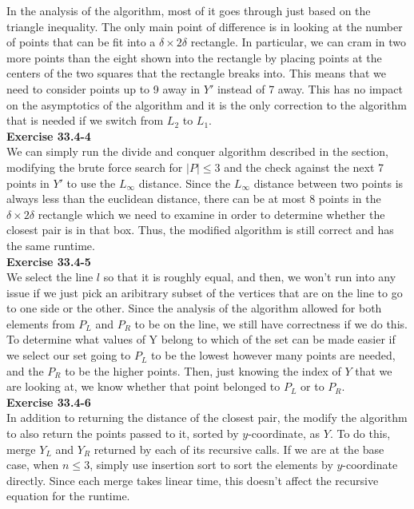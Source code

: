 \documentclass{article}
\begin{document}
In the analysis of the algorithm, most of it goes through just based on the triangle inequality. The only main point of difference is in looking at the number of points that can be fit into a $\delta \times 2\delta$ rectangle. In particular, we can cram in two more points than the eight shown into the rectangle by placing points at the centers of the two squares that the rectangle breaks into. This means that we need to consider points up to 9 away in $Y'$ instead of 7 away. This has no impact on the asymptotics of the algorithm and it is the only correction to the algorithm that is needed if we switch from $L_2$ to $L_1$.\\

\noindent\textbf{Exercise 33.4-4}\\

We can simply run the divide and conquer algorithm described in the section, modifying the brute force search for $|P| \leq 3$ and the check against the next 7 points in $Y'$ to use the $L_\infty$ distance.  Since the $L_\infty$ distance between two points is always less than the euclidean distance, there can be at most 8 points in the $\delta \times 2\delta$ rectangle which we need to examine in order to determine whether the closest pair is in that box.  Thus, the modified algorithm is still correct and has the same runtime. \\

\noindent\textbf{Exercise 33.4-5}\\

We select the line $l$ so that it is roughly equal, and then, we won't run into any issue if we just pick an aribitrary subset of the vertices that are on the line to go to one side or the other. Since the analysis of the algorithm allowed for both elements from $P_L$ and $P_R$ to be on the line, we still have correctness if we do this. To determine what values of Y belong to which of the set can be made easier if we select our set going to $P_L$ to be the lowest however many points are needed, and the $P_R$ to be the higher points. Then, just knowing the index of $Y$ that we are looking at, we know whether that point belonged to $P_L$ or to $P_R$.\\

\noindent\textbf{Exercise 33.4-6}\\

In addition to returning the distance of the closest pair, the modify the algorithm to also return the points passed to it, sorted by $y$-coordinate, as $Y$.  To do this, merge $Y_L$ and $Y_R$ returned by each of its recursive calls.  If we are at the base case, when $n \leq 3$, simply use insertion sort to sort the elements by $y$-coordinate directly. Since each merge takes linear time, this doesn't affect the recursive equation for the runtime. \\
\end{document}
